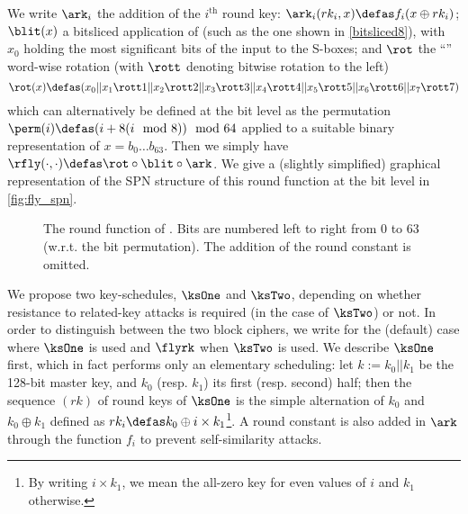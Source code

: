 We write $\ark_i$ the addition of the $i^\text{th}$ round key: $\ark_i(rk_i, x) \defas f_i(x \oplus rk_i)$;
$\blit(x)$ a bitsliced application of
\littlunOne (such as \eg the one shown in \autoref{bitsliced8}), with $x_0$ holding the most significant bits of the input to the S-boxes;
and $\rot$ the ``\shiftrow'' word-wise rotation (with $\rott$ denoting bitwise rotation to the left)
\[
\rot(x) \defas (x_0||x_1 \rott 1||x_2 \rott 2||x_3 \rott 3||x_4 \rott 4||x_5 \rott 5||x_6 \rott 6||x_7 \rott 7)
\]
which can alternatively be defined at the bit level as the permutation $\perm(i) \defas (i + 8(i \mod 8)) \mod 64$
applied to a suitable binary representation of $x = b_0\ldots b_{63}$. Then we simply have %
$\rfly(\cdot,\cdot) \defas \rot \circ \blit \circ \ark$.
We give a (slightly simplified) graphical representation of the SPN structure of this round function at the bit level in \autoref{fig:fly_spn}.

\begin{figure}[ht]
\centering

\caption[The round function of \fly.]{The round function of \fly.\label{fig:fly_spn} Bits are numbered left to right from 0 to 63 (w.r.t. the bit permutation). The addition of the round constant is
omitted.}
\end{figure}

\medskip


We propose two key-schedules, $\ksOne$ and $\ksTwo$, depending on whether resistance to related-key attacks is required (in the case of $\ksTwo$) or not.
In order to distinguish between the two block ciphers, we write \fly for the (default) case where $\ksOne$ is used and $\flyrk$ when $\ksTwo$ is used.
We describe $\ksOne$ first, which in fact performs only an elementary scheduling:
let $k := k_0||k_1$ be the 128-bit master key, and $k_0$ (resp. $k_1$) its first (resp. second) half; then 
the sequence $(rk)$ of round keys of $\ksOne$ is the simple alternation of $k_0$ and $k_0 \oplus k_1$ defined as $rk_i \defas k_0 \oplus i\times k_1$\footnote{By writing $i\times k_1$,
we mean the all-zero key for even values of $i$ and $k_1$ otherwise.}. A round constant is also added in $\ark$ through the function $f_i$ to prevent self-similarity attacks.

